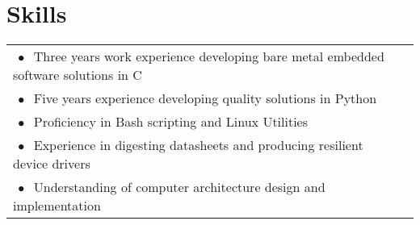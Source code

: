 \documentclass{article}
\begin{document}
\section{Skills}
\begin{tabular}{p{20cm} l}
    $\ \bullet \ $ Three years work experience developing bare metal embedded software solutions in C
    \\

    $\ \bullet \ $ Five years experience developing quality solutions in Python
    \\

    $\ \bullet \ $ Proficiency in Bash scripting and Linux Utilities
    \\

    $\ \bullet \ $ Experience in digesting datasheets and producing resilient device drivers
    \\

    $\ \bullet \ $ Understanding of computer architecture design and implementation
    \\

\end{tabular}


\iffalse
\end{document}
